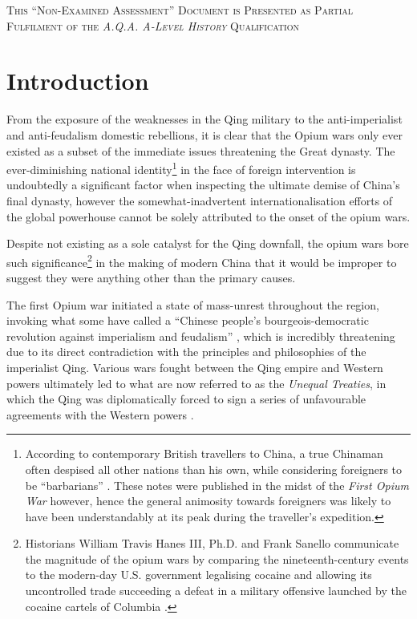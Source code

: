 \documentclass{article}
\newcommand{\textrule}{\noindent\makebox[\linewidth]{\rule{\linewidth}{0.4pt}}}
\begin{document}
\textrule%
\vspace*{0.6em}
{\centering \textsc{This ``Non-Examined Assessment'' Document is Presented as Partial Fulfilment of the \textit{A.Q.A. A-Level History} Qualification}\\}
\textrule%

\section{Introduction}

        From the exposure of the weaknesses in the Qing military to the anti-imperialist and anti-feudalism domestic rebellions, it is clear that the Opium wars only ever existed as a subset of the immediate issues threatening the Great dynasty. The ever-diminishing national identity\footnote{According to contemporary British travellers to China, a true Chinaman often despised all other nations than his own, while considering foreigners to be ``barbarians'' \autocite{McPherson:1842}. These notes were published in the midst of the \textit{First Opium War} however, hence the general animosity towards foreigners was likely to have been understandably at its peak during the traveller's expedition.} in the face of foreign intervention is undoubtedly a significant factor when inspecting the ultimate demise of China's final dynasty, however the somewhat-inadvertent internationalisation efforts of the global powerhouse cannot be solely attributed to the onset of the opium wars.

        Despite not existing as a sole catalyst for the Qing downfall, the opium wars bore such significance\footnote{Historians William Travis Hanes III, Ph.D. and Frank Sanello communicate the magnitude of the opium wars by comparing the nineteenth-century events to the modern-day U.S. government legalising cocaine and allowing its uncontrolled trade succeeding a defeat in a military offensive launched by the cocaine cartels of Columbia \autocite{Hanes:2004}.} in the making of modern China that it would be improper to suggest they were anything other than the primary causes.

        The first Opium war initiated a state of mass-unrest throughout the region, invoking what some have called a ``Chinese people's bourgeois-democratic revolution against imperialism and feudalism'' \autocite{Janin:1999}, which is incredibly threatening due to its direct contradiction with the principles and philosophies of the imperialist Qing. Various wars fought between the Qing empire and Western powers ultimately led to what are now referred to as the \textit{Unequal Treaties}, in which the Qing was diplomatically forced to sign a series of unfavourable agreements with the Western powers \autocite{Wang:2005}.
\end{document}
